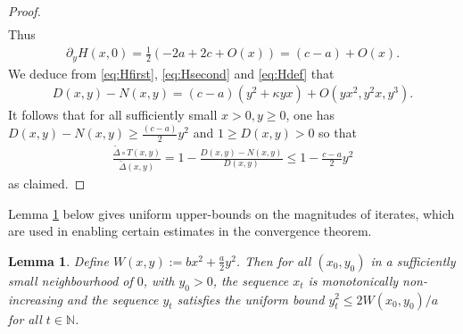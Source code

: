 \documentclass{article}
\newcommand{\NB}{\mathbb{N}}
\theoremstyle{plain}
\newtheorem{lemma}[theorem]{Lemma}
\theoremstyle{definition}
\theoremstyle{remark}
\begin{document}
\begin{proof}
\begin{align}
    \end{align}
    Thus
    \begin{align}
        \partial_yH(x,0) = \frac{1}{2}(-2a+2c+O(x)) = (c-a)+O(x).\label{eq:Hsecond}
    \end{align}
    We deduce from \eqref{eq:Hfirst}, \eqref{eq:Hsecond} and \eqref{eq:Hdef} that
    \begin{align}
        D(x,y)-N(x,y) = (c-a)(y^2+\kappa yx) + O(yx^2,y^2x,y^3).
    \end{align}
    It follows that for all sufficiently small $x>0, y\geq0$, one has $D(x,y)-N(x,y)\geq \frac{(c-a)}{2}y^2$ and $1\geq D(x,y)>0$ so that
    \begin{align}
        \frac{\widetilde{\Delta}\circ T(x,y)}{\widetilde{\Delta}(x,y)} = 1-\frac{D(x,y)-N(x,y)}{D(x,y)}\leq 1-\frac{c-a}{2}y^2
    \end{align}
    as claimed.
\end{proof}

Lemma \ref{lem:technical2} below gives uniform upper-bounds on the magnitudes of iterates, which are used in enabling certain estimates in the convergence theorem.

\begin{lemma}\label{lem:technical2}
    Define $W(x,y):=bx^2+\frac{a}{2}y^2$. Then for all $(x_0,y_0)$ in a sufficiently small neighbourhood of $0$, with $y_0>0$, the sequence $x_t$ is monotonically non-increasing and the sequence $y_t$ satisfies the uniform bound $y_t^2\leq 2W(x_0,y_0)/a$ for all $t\in\NB$.
\end{lemma}
\end{document}
